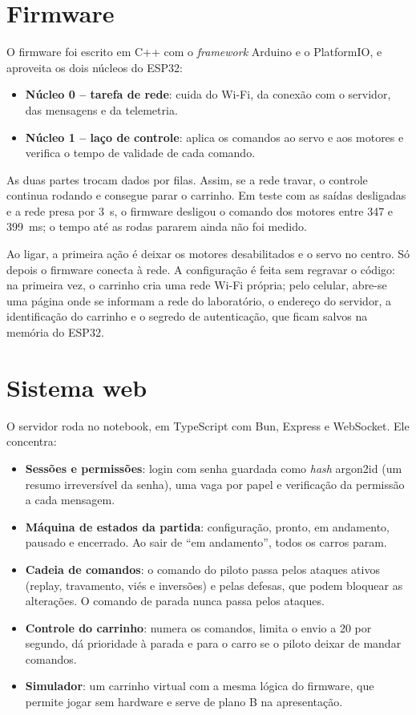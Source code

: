 \documentclass[12pt,openright,oneside,a4paper,english,brazil]{abntex2}
\begin{document}
\section{Firmware}

O firmware foi escrito em C++ com o \emph{framework} Arduino e o PlatformIO, e aproveita os dois núcleos do ESP32:

\begin{itemize}
  \item \textbf{Núcleo 0 -- tarefa de rede}: cuida do Wi-Fi, da conexão com o servidor, das mensagens e da telemetria.
  \item \textbf{Núcleo 1 -- laço de controle}: aplica os comandos ao servo e aos motores e verifica o tempo de validade de cada comando.
\end{itemize}

As duas partes trocam dados por filas. Assim, se a rede travar, o controle continua rodando e consegue parar o carrinho. Em teste com as saídas desligadas e a rede presa por 3~s, o firmware desligou o comando dos motores entre 347 e 399~ms; o tempo até as rodas pararem ainda não foi medido.

Ao ligar, a primeira ação é deixar os motores desabilitados e o servo no centro. Só depois o firmware conecta à rede. A configuração é feita sem regravar o código: na primeira vez, o carrinho cria uma rede Wi-Fi própria; pelo celular, abre-se uma página onde se informam a rede do laboratório, o endereço do servidor, a identificação do carrinho e o segredo de autenticação, que ficam salvos na memória do ESP32.

\section{Sistema web}

O servidor roda no notebook, em TypeScript com Bun, Express e WebSocket. Ele concentra:

\begin{itemize}
  \item \textbf{Sessões e permissões}: login com senha guardada como \emph{hash} argon2id (um resumo irreversível da senha), uma vaga por papel e verificação da permissão a cada mensagem.
  \item \textbf{Máquina de estados da partida}: configuração, pronto, em andamento, pausado e encerrado. Ao sair de \enquote{em andamento}, todos os carros param.
  \item \textbf{Cadeia de comandos}: o comando do piloto passa pelos ataques ativos (replay, travamento, viés e inversões) e pelas defesas, que podem bloquear as alterações. O comando de parada nunca passa pelos ataques.
  \item \textbf{Controle do carrinho}: numera os comandos, limita o envio a 20 por segundo, dá prioridade à parada e para o carro se o piloto deixar de mandar comandos.
  \item \textbf{Simulador}: um carrinho virtual com a mesma lógica do firmware, que permite jogar sem hardware e serve de plano B na apresentação.
\end{itemize}
\end{document}
